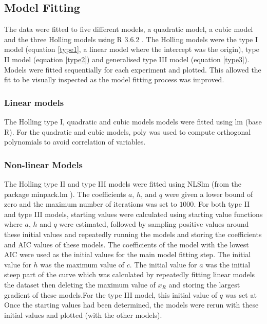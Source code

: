 \documentclass{article}
\begin{document}
\subsection{Model Fitting}
The data were fitted to five different models, a quadratic model, a cubic model and the three Holling models \cite{Holling1959} using R 3.6.2 \cite{RCoreTeam2017}. The Holling models were the type I model (equation \ref{type1}, a linear model where the intercept was the origin), type II model (equation \ref{type2}) and generalised type III model (equation \ref{type3}).
Models were fitted sequentially for each experiment and plotted. This allowed the fit to be visually inspected as the model fitting process was improved.
\subsubsection{Linear models}
 The Holling type I, quadratic and cubic models models were fitted using lm (base R). For the quadratic and cubic models, poly was used to compute orthogonal polynomials to avoid correlation of variables.
\subsubsection{Non-linear Models}
The Holling type II and type III models were fitted using NLSlm (from the package minpack.lm \cite{Elzhov2016}). The coefficients $a$, $h$, and $q$ were given a lower bound of zero and the maximum number of iterations was set to $1000$. For both type II and type III models, starting values were calculated using starting value functions where $a$, $h$ and $q$ were estimated, followed by sampling positive values around these initial values and repeatedly running the models and storing the coefficients and AIC values of these models. The coefficients of the model with the lowest AIC were used as the initial values for the main model fitting step. The initial value for $h$ was the maximum value of $c$. The initial value for $a$ was the initial steep part of the curve which was calculated by repeatedly fitting linear models the dataset then deleting the maximum value of $x_R$ and storing the largest gradient of these models.For the type III model, this initial value of $q$ was set at %
Once the starting values had been determined, the models were rerun with these initial values and plotted (with the other models). %
\end{document}
